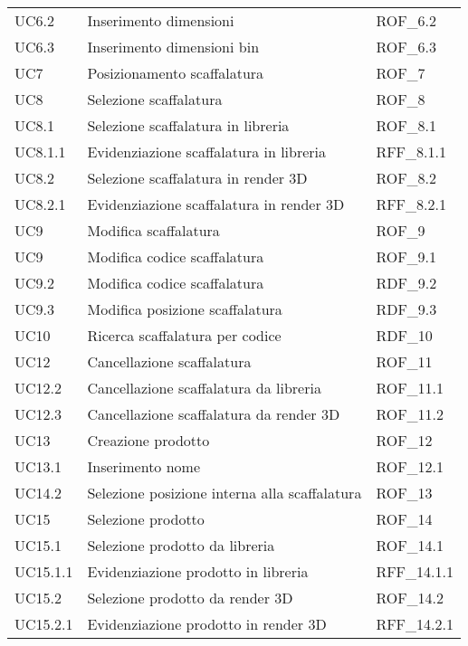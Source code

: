 \begin{xltabular}{\textwidth}{ p{0.3\textwidth} | X | p{0.2\textwidth} }
    UC6.2 & Inserimento dimensioni & ROF\_6.2\\
    UC6.3 & Inserimento dimensioni bin & ROF\_6.3\\
    UC7 & Posizionamento scaffalatura & ROF\_7\\
    UC8 & Selezione scaffalatura & ROF\_8\\
    UC8.1 & Selezione scaffalatura in libreria & ROF\_8.1\\
    UC8.1.1 & Evidenziazione scaffalatura in libreria & RFF\_8.1.1\\
    UC8.2 & Selezione scaffalatura in render 3D & ROF\_8.2\\
    UC8.2.1 & Evidenziazione scaffalatura in render 3D & RFF\_8.2.1\\
    UC9 & Modifica scaffalatura & ROF\_9\\
    UC9 & Modifica codice scaffalatura & ROF\_9.1\\
    UC9.2 & Modifica codice scaffalatura & RDF\_9.2\\
    UC9.3 & Modifica posizione scaffalatura & RDF\_9.3\\
    UC10 & Ricerca scaffalatura per codice & RDF\_10\\
    UC12 & Cancellazione scaffalatura & ROF\_11\\
    UC12.2 & Cancellazione scaffalatura da libreria & ROF\_11.1\\
    UC12.3 & Cancellazione scaffalatura da render 3D & ROF\_11.2\\
    UC13 & Creazione prodotto & ROF\_12\\
    UC13.1 & Inserimento nome & ROF\_12.1\\
    UC14.2 & Selezione posizione interna alla scaffalatura & ROF\_13\\
    UC15 & Selezione prodotto & ROF\_14\\
    UC15.1 & Selezione prodotto da libreria & ROF\_14.1\\
    UC15.1.1 & Evidenziazione prodotto in libreria & RFF\_14.1.1\\
    UC15.2 & Selezione prodotto da render 3D & ROF\_14.2\\
    UC15.2.1 & Evidenziazione prodotto in render 3D & RFF\_14.2.1\\

\end{xltabular}
